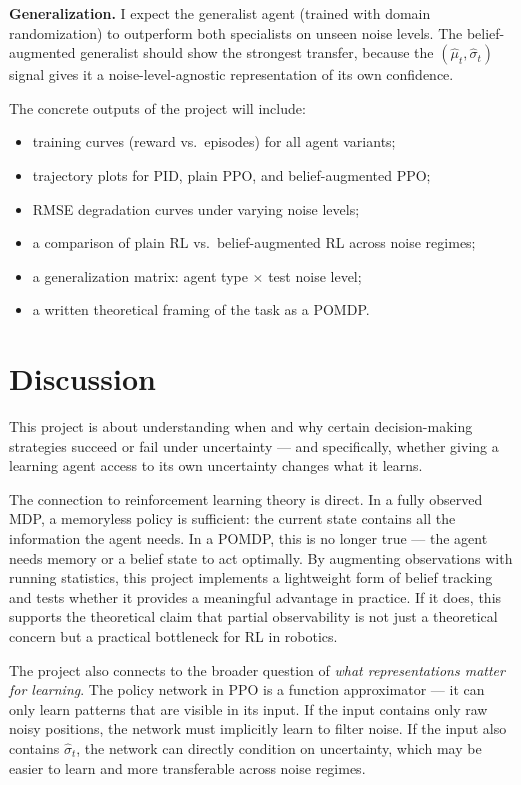 \documentclass[11pt]{article}
\begin{document}
\textbf{Generalization.} I expect the generalist agent (trained with domain randomization) to outperform both specialists on unseen noise levels. The belief-augmented generalist should show the strongest transfer, because the $(\hat{\mu}_t, \hat{\sigma}_t)$ signal gives it a noise-level-agnostic representation of its own confidence.

The concrete outputs of the project will include:
\begin{itemize}[leftmargin=1.8em]
    \item training curves (reward vs.\ episodes) for all agent variants;
    \item trajectory plots for PID, plain PPO, and belief-augmented PPO;
    \item RMSE degradation curves under varying noise levels;
    \item a comparison of plain RL vs.\ belief-augmented RL across noise regimes;
    \item a generalization matrix: agent type $\times$ test noise level;
    \item a written theoretical framing of the task as a POMDP.
\end{itemize}

\section*{Discussion}

This project is about understanding when and why certain decision-making strategies succeed or fail under uncertainty — and specifically, whether giving a learning agent access to its own uncertainty changes what it learns.

The connection to reinforcement learning theory is direct. In a fully observed MDP, a memoryless policy is sufficient: the current state contains all the information the agent needs. In a POMDP, this is no longer true — the agent needs memory or a belief state to act optimally. By augmenting observations with running statistics, this project implements a lightweight form of belief tracking and tests whether it provides a meaningful advantage in practice. If it does, this supports the theoretical claim that partial observability is not just a theoretical concern but a practical bottleneck for RL in robotics.

The project also connects to the broader question of \emph{what representations matter for learning}. The policy network in PPO is a function approximator — it can only learn patterns that are visible in its input. If the input contains only raw noisy positions, the network must implicitly learn to filter noise. If the input also contains $\hat{\sigma}_t$, the network can directly condition on uncertainty, which may be easier to learn and more transferable across noise regimes.
\end{document}
